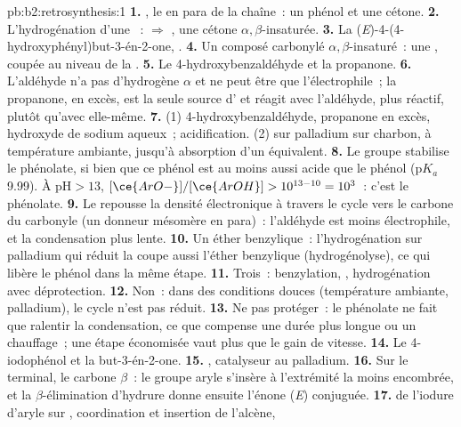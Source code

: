 \begin{solution}{pb:b2:retrosynthesis:1}
\textbf{1.} , le  en para de la chaîne~: un phénol et une cétone.
\textbf{2.} L'hydrogénation d'une ~:  $\Rightarrow$ , une cétone
$\alpha,\beta$-insaturée.
\textbf{3.} La (\textit{E})-4-(4-hydroxyphényl)but-3-én-2-one, .
\textbf{4.} Un composé carbonylé $\alpha,\beta$-insaturé~: une , coupée au niveau de la .
\textbf{5.} Le 4-hydroxybenzaldéhyde et la propanone.
\textbf{6.} L'aldéhyde n'a pas d'hydrogène $\alpha$ et ne peut être que l'électrophile~; la propanone, en
excès, est la seule source d' et réagit avec l'aldéhyde, plus réactif, plutôt qu'avec elle-même.
\textbf{7.} (1) 4-hydroxybenzaldéhyde, propanone en excès, hydroxyde de sodium aqueux~; acidification. (2)
 sur palladium sur charbon, à température ambiante, jusqu'à absorption d'un équivalent.
\textbf{8.} Le groupe  stabilise le phénolate, si bien que ce phénol est au moins aussi acide que le
phénol ($\mathrm pK_a$ 9.99). À $\mathrm{pH} > 13$, $[\ce{ArO-}]/[\ce{ArOH}] > 10^{13-10} = 10^3$~: c'est
le phénolate.
\textbf{9.} Le  repousse la densité électronique à travers le cycle vers le carbone du carbonyle (un
donneur mésomère en para)~: l'aldéhyde est moins électrophile, et la condensation plus lente.
\textbf{10.} Un éther benzylique~: l'hydrogénation sur palladium qui réduit la  coupe aussi
l'éther benzylique (hydrogénolyse), ce qui libère le phénol dans la même étape.
\textbf{11.} Trois~: benzylation, , hydrogénation avec déprotection.
\textbf{12.} Non~: dans des conditions douces (température ambiante, palladium), le cycle  n'est pas réduit.
\textbf{13.} Ne pas protéger~: le phénolate ne fait que ralentir la condensation, ce que compense une
durée plus longue ou un chauffage~; une étape économisée vaut plus que le gain de vitesse.
\textbf{14.} Le 4-iodophénol et la but-3-én-2-one.
\textbf{15.} , catalyseur au palladium.
\textbf{16.} Sur le  terminal, le carbone $\beta$~: le groupe aryle s'insère à l'extrémité la moins
encombrée, et la $\beta$-élimination d'hydrure donne ensuite l'énone (\textit{E}) conjuguée.
\textbf{17.}  de l'iodure d'aryle sur , coordination et insertion de l'alcène,

\end{solution}
